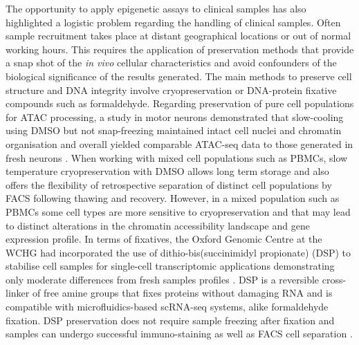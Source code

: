 The opportunity to apply epigenetic assays to clinical samples has also highlighted a logistic problem regarding the handling of clinical samples. Often sample recruitment takes place at distant geographical locations or out of normal working hours. This requires the application of preservation methods that provide a snap shot of the \textit{in vivo} cellular characteristics and avoid confounders of the biological significance of the results generated. The main methods to preserve cell structure and DNA integrity involve cryopreservation or DNA-protein fixative compounds such as formaldehyde. Regarding preservation of pure cell populations for ATAC processing, a study in motor neurons demonstrated that slow-cooling using DMSO but not snap-freezing maintained intact cell nuclei and chromatin organisation and overall yielded comparable ATAC-seq data to those generated in fresh neurons \parencite{Milani2016}. When working with mixed cell populations such as PBMCs, slow temperature cryopreservation with DMSO allows long term storage and also offers the flexibility of retrospective separation of distinct cell populations by FACS following thawing and recovery. However, in a mixed population such as PBMCs some cell types are more sensitive to cryopreservation and that may lead to distinct alterations in the chromatin accessibility landscape and gene expression profile. In terms of fixatives, the Oxford Genomic Centre at the WCHG had incorporated the use of dithio-bis(succinimidyl propionate) (DSP) to stabilise cell samples for single-cell transcriptomic applications demonstrating only moderate differences from fresh samples profiles \parencite{Attar2018}. DSP is a reversible cross-linker of free amine groups that fixes proteins without damaging RNA and is compatible with microfluidics-based scRNA-seq systems, alike formaldehyde fixation. DSP preservation does not require sample freezing after fixation and samples can undergo successful immuno-staining as well as FACS cell separation \parencite{Espina2013}. %



